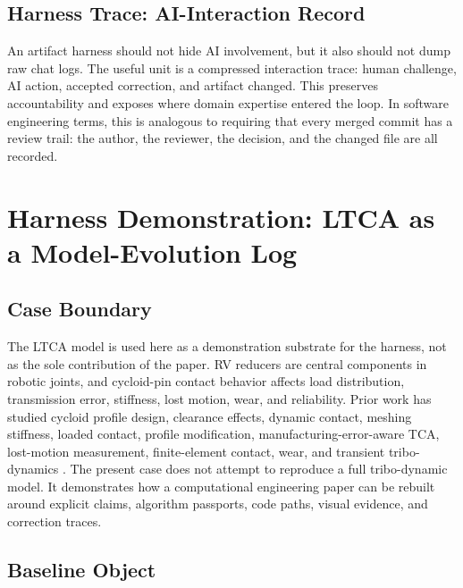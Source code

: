 \documentclass{article}
\begin{document}
\subsection{Harness Trace: AI-Interaction Record}

An artifact harness should not hide AI involvement, but it also should not dump raw chat logs. The useful unit is a compressed interaction trace: human challenge, AI action, accepted correction, and artifact changed. This preserves accountability and exposes where domain expertise entered the loop. In software engineering terms, this is analogous to requiring that every merged commit has a review trail: the author, the reviewer, the decision, and the changed file are all recorded.

\section{Harness Demonstration: LTCA as a Model-Evolution Log}

\subsection{Case Boundary}

The LTCA model is used here as a demonstration substrate for the harness, not as the sole contribution of the paper. RV reducers are central components in robotic joints, and cycloid-pin contact behavior affects load distribution, transmission error, stiffness, lost motion, wear, and reliability. Prior work has studied cycloid profile design, clearance effects, dynamic contact, meshing stiffness, loaded contact, profile modification, manufacturing-error-aware TCA, lost-motion measurement, finite-element contact, wear, and transient tribo-dynamics \citep{sensinger2010optimization,ivanovic2012clearances,lin2014twostage,xu2016dynamic,yang2018stiffness,tsai2017ltca,li2017clearancefit,xu2019assembling,wang2019transmission,sun2019cbr,sun2024cbrtca,sun2018lostmotion,xu2019lostmotion,xu2019bcptm,li2023dynamicrv,li2023wearprofile,wang2023ltca,zhang2023iga,li2025tribodynamics}. The present case does not attempt to reproduce a full tribo-dynamic model. It demonstrates how a computational engineering paper can be rebuilt around explicit claims, algorithm passports, code paths, visual evidence, and correction traces.

\subsection{Baseline Object}
\end{document}
